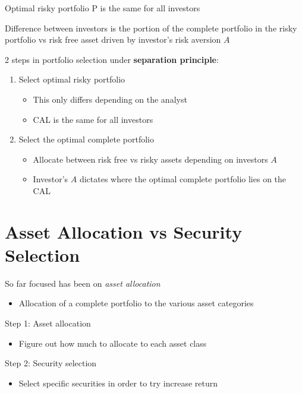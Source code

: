 \documentclass[]{book}
\providecommand{\tightlist}{%
  \setlength{\itemsep}{0pt}\setlength{\parskip}{0pt}}
\theoremstyle{definition}
\theoremstyle{definition}
\theoremstyle{remark}
\begin{document}
Optimal risky portfolio P is the same for all investors

Difference between investors is the portion of the complete portfolio in
the risky portfolio vs risk free asset driven by investor's risk
aversion \(A\)

2 steps in portfolio selection under \textbf{separation principle}:

\begin{enumerate}
\def\labelenumi{\arabic{enumi})}
\item
  Select optimal risky portfolio

  \begin{itemize}
  \item
    This only differs depending on the analyst
  \item
    CAL is the same for all investors
  \end{itemize}
\item
  Select the optimal complete portfolio

  \begin{itemize}
  \item
    Allocate between risk free vs risky assets depending on investors
    \(A\)
  \item
    Investor's \(A\) dictates where the optimal complete portfolio lies
    on the CAL
  \end{itemize}
\end{enumerate}

\section{Asset Allocation vs Security
Selection}\label{asset-allocation-vs-security-selection}

So far focused has been on \emph{asset allocation}

\begin{itemize}
\tightlist
\item
  Allocation of a complete portfolio to the various asset categories
\end{itemize}

Step 1: Asset allocation

\begin{itemize}
\tightlist
\item
  Figure out how much to allocate to each asset class
\end{itemize}

Step 2: Security selection

\begin{itemize}
\tightlist
\item
  Select specific securities in order to try increase return
\end{itemize}
\end{document}
